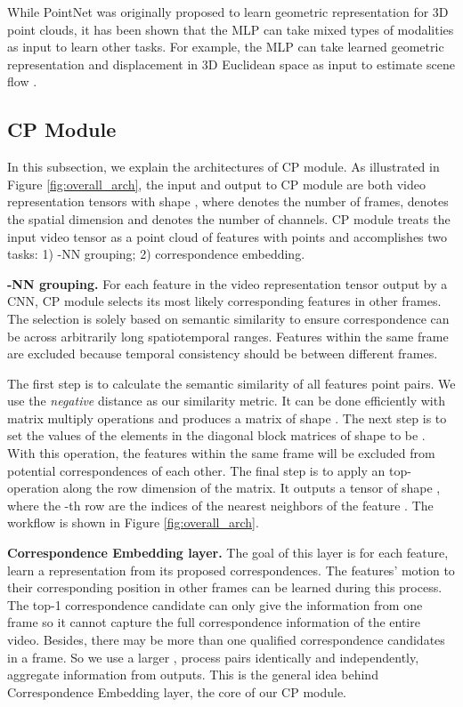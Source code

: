 \documentclass[10pt,twocolumn,letterpaper]{article}
\begin{document}
While PointNet was originally proposed to learn geometric representation for 3D point clouds, it has been shown that the MLP can take mixed types of modalities as input to learn other tasks. For example, the MLP can take learned geometric representation and displacement in 3D Euclidean space as input to estimate scene flow \cite{FlowNet3D}.


\subsection{CP Module}

In this subsection, we explain the architectures of CP module. As illustrated in Figure \ref{fig:overall_arch}, the input and output to CP module are both video representation tensors with shape , where  denotes the number of frames,  denotes the spatial dimension and   denotes the number of channels. CP module treats the input video tensor as a point cloud of features with  points and accomplishes two tasks: 1) -NN grouping; 2) correspondence embedding. 

\textbf{\boldmath{}-NN grouping.} For each feature in the video representation tensor output by a CNN, CP module selects its  most likely corresponding features in other frames. The selection is solely based on semantic similarity to ensure correspondence can be across arbitrarily long spatiotemporal ranges. Features within the same frame are excluded because temporal consistency should be between different frames.

The first step is to calculate the
semantic similarity of all features point pairs. 
We use the \textit{negative}  distance as our similarity metric. 
It can be done efficiently with matrix multiply operations and produces a matrix of shape . 
The next step is to set the values of the elements in the  diagonal block matrices of shape  to be . With this operation, the features within the same frame will be excluded from potential correspondences of each other. The final step is to apply an  top- operation along the row dimension of the matrix. It outputs a tensor of shape , where the -th row are the indices of the  nearest neighbors of the feature . The workflow is shown in Figure \ref{fig:overall_arch}.

\textbf{Correspondence Embedding layer.} The goal of this layer is for each feature, learn a representation from its proposed correspondences.
The features' motion to their corresponding position in other frames can be learned during this process. 
The top-1 correspondence candidate can only give the information from one frame so it cannot capture the full correspondence information of the entire video. 
Besides, there may be more than one qualified correspondence candidates in a frame.
So we use a larger , process  pairs identically and independently, aggregate information from  outputs. This is the general idea behind Correspondence Embedding layer, the core of our CP module.
\end{document}
